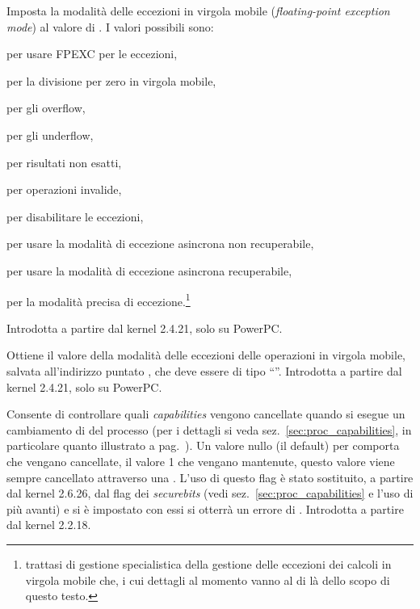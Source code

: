 \begin{basedescript}{\desclabelwidth{1.5cm}\desclabelstyle{\nextlinelabel}}
\item[\constd{PR\_SET\_FPEXC}] Imposta la modalità delle eccezioni in virgola
  mobile (\textit{floating-point exception mode}) al valore di .
  I valori possibili sono: 
  \begin{itemize*}
  \item {} per usare FPEXC per le eccezioni,
  \item {} per la divisione per zero in virgola mobile,
  \item {} per gli overflow,
  \item {} per gli underflow,
  \item {} per risultati non esatti,
  \item {} per operazioni invalide,
  \item {} per disabilitare le eccezioni,
  \item {} per usare la modalità di eccezione
    asincrona non recuperabile,
  \item {} per usare la modalità di eccezione
    asincrona recuperabile,
  \item {} per la modalità precisa di
    eccezione.\footnote{trattasi di gestione specialistica della gestione
      delle eccezioni dei calcoli in virgola mobile che, i cui dettagli al
      momento vanno al di là dello scopo di questo testo.}
  \end{itemize*}
Introdotta a partire dal kernel 2.4.21, solo su PowerPC.

\item[\constd{PR\_GET\_FPEXC}] Ottiene il valore della modalità delle eccezioni
  delle operazioni in virgola mobile, salvata all'indirizzo
  puntato , che deve essere di tipo ``''.  Introdotta
  a partire dal kernel 2.4.21, solo su PowerPC.

\item[\constd{PR\_SET\_KEEPCAPS}] Consente di controllare quali
  \textit{capabilities} vengono cancellate quando si esegue un cambiamento di
   del processo (per i dettagli si veda
  sez.~\ref{sec:proc_capabilities}, in particolare quanto illustrato a
  pag.~\pageref{sec:capability-uid-transition}). Un valore nullo (il default)
  per  comporta che vengano cancellate, il valore 1 che vengano
  mantenute, questo valore viene sempre cancellato attraverso una .
  L'uso di questo flag è stato sostituito, a partire dal kernel 2.6.26, dal
  flag  dei \textit{securebits} (vedi
  sez.~\ref{sec:proc_capabilities} e l'uso di  più
  avanti) e si è impostato con essi  si
  otterrà un errore di .  Introdotta a partire dal kernel
  2.2.18.


\end{basedescript}
